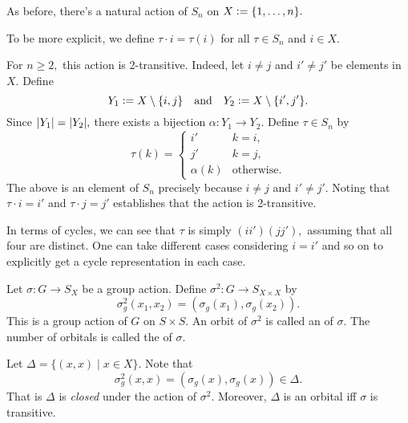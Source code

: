 \begin{ex} \label{ex:actsymgroups}
	As before, there's a natural action of $S_n$ on $X \vcentcolon= \{1, \ldots, n\}.$ 

	To be more explicit, we define $\tau \cdot i = \tau(i)$ for all $\tau \in S_n$ and $i \in X.$

	For $n \ge 2,$ this action is 2-transitive. Indeed, let $i \neq j$ and $i' \neq j'$ be elements in $X.$ Define 
	\begin{equation*} 
		Y_1 \vcentcolon= X \setminus \{i, j\} \quad\text{and}\quad Y_2 \vcentcolon= X \setminus \{i', j'\}.
	\end{equation*}
	Since ${\left\lvert Y_1 \right\lvert} = {\left\lvert Y_2 \right\lvert},$ there exists a bijection $\alpha : Y_1 \to Y_2.$ Define $\tau \in S_n$ by
	\begin{equation*} 
		\tau(k) = \begin{cases}
			i' & k = i,\\
			j' & k = j,\\
			\alpha(k) & \text{otherwise}.
		\end{cases}
	\end{equation*}
	The above is an element of $S_n$ precisely because $i \neq j$ and $i' \neq j'.$ Noting that $\tau \cdot i = i'$ and $\tau \cdot j = j'$ establishes that the action is 2-transitive.

	In terms of cycles, we can see that $\tau$ is simply $(ii')(jj'),$ assuming that all four are distinct. One can take different cases considering $i = i'$ and so on to explicitly get a cycle representation in each case.
\end{ex}

\begin{defn}%
	Let $\sigma : G \to S_X$ be a group action. Define $\sigma^2 : G \to S_{X \times X}$ by
	\begin{equation*} 
		\sigma_g^2(x_1, x_2) = (\sigma_g(x_1), \sigma_g(x_2)).
	\end{equation*}
	This is a group action of $G$ on $S \times S.$ An orbit of $\sigma^2$ is called an  of $\sigma.$ The number of orbitals is called the  of $\sigma.$
\end{defn}

\begin{rem}
	Let $\Delta = \{(x, x) \mid x \in X\}.$ Note that 
	\begin{equation*} 
		\sigma_g^2(x, x) = (\sigma_g(x), \sigma_g(x)) \in \Delta.
	\end{equation*}
	That is $\Delta$ is \emph{closed} under the action of $\sigma^2.$ Moreover, $\Delta$ is an orbital iff $\sigma$ is transitive.
\end{rem}

